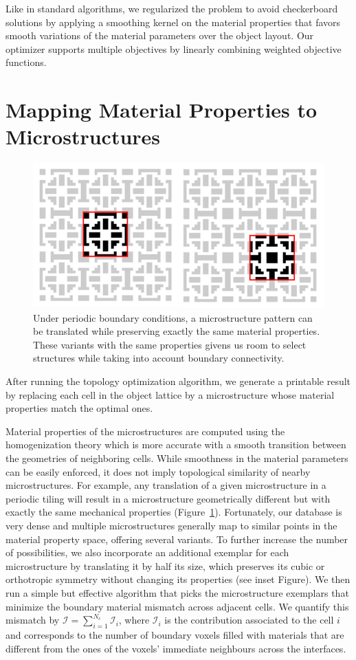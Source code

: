 Like in standard algorithms, we regularized the problem to avoid checkerboard solutions by applying a smoothing kernel on the material properties that favors smooth variations of the material parameters over the object layout.
Our optimizer supports multiple objectives by linearly combining weighted objective functions.
\section{Mapping Material Properties to Microstructures}
\begin{figure}
	\centering
 	\includegraphics[width=0.4\linewidth]{images/TranslatedMicrostructure.png}
 	\caption{Under periodic boundary conditions, a microstructure pattern can be translated while preserving exactly the same material properties.
		These variants with the same properties givens us room to select structures while taking into account boundary connectivity.}
 	\label{fig:translateMic}
\end{figure}
After running the topology optimization algorithm, we generate a printable result by replacing each cell in the object lattice by a microstructure whose material properties match the optimal ones.

Material properties of the microstructures are computed using the homogenization theory which is more accurate with a smooth transition between the geometries of neighboring cells.
While smoothness in the material parameters can be easily enforced, it does not imply topological similarity of nearby microstructures. 
For example, any translation of a given microstructure in a periodic tiling will result in a microstructure geometrically different but with exactly the same mechanical properties (Figure~\ref{fig:translateMic}). 
Fortunately, our database is very dense and multiple microstructures generally map to similar points in the material property space, offering several variants. To further increase the number of possibilities, we also incorporate an additional exemplar for each microstructure by translating it by half its size, which preserves its cubic or orthotropic symmetry without changing its properties (see inset Figure). We then run a simple but effective algorithm that picks the microstructure exemplars that minimize the boundary material mismatch across adjacent cells. We quantify this mismatch by $\mathcal{I}=\sum_{i=1}^{N_c} \mathcal{I}_i$, where $\mathcal{I}_i$ is the contribution associated to the cell $i$ and corresponds to the number of boundary voxels filled with materials that are different from the ones of the voxels' immediate neighbours across the interfaces.

